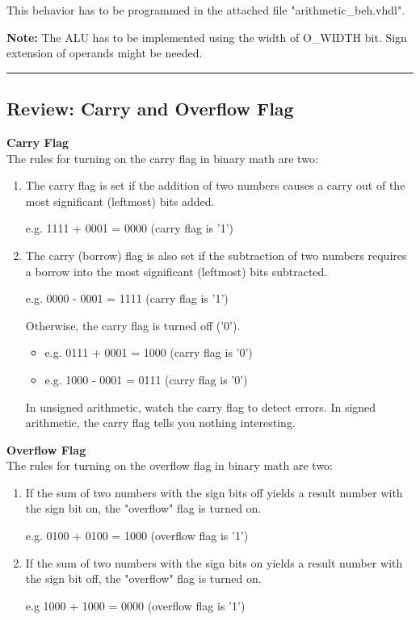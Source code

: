 \documentclass[a4paper,12pt]{article}
\begin{document}
This behavior has to be programmed in the attached file "arithmetic\_beh.vhdl".


\textbf{Note:} The ALU has to be implemented using the width of {{O_WIDTH}} bit. Sign extension
of operands might be needed.


\rule{16cm}{0.4pt}\par
\subsection*{Review: Carry and Overflow Flag}

\textbf{Carry Flag}\\
The rules for turning on the carry flag in binary math are two:
\begin{enumerate}
\item The carry flag is set if the addition of two numbers causes a carry
   out of the most significant (leftmost) bits added.

   e.g. 1111 + 0001 = 0000 (carry flag is '1')

\item The carry (borrow) flag is also set if the subtraction of two numbers
   requires a borrow into the most significant (leftmost) bits subtracted.

   e.g. 0000 - 0001 = 1111 (carry flag is '1')

Otherwise, the carry flag is turned off ('0').
\begin{itemize}
\item e.g. 0111 + 0001 = 1000 (carry flag is '0')
\item e.g. 1000 - 0001 = 0111 (carry flag is '0')
\end{itemize}


In unsigned arithmetic, watch the carry flag to detect errors.
In signed arithmetic, the carry flag tells you nothing interesting.

\end{enumerate}

\textbf{Overflow Flag}\\
The rules for turning on the overflow flag in binary math are two:
\begin{enumerate}
\item If the sum of two numbers with the sign bits off yields a result number
   with the sign bit on, the "overflow" flag is turned on.

   e.g. 0100 + 0100 = 1000 (overflow flag is '1')

\item If the sum of two numbers with the sign bits on yields a result number
   with the sign bit off, the "overflow" flag is turned on.

   e.g 1000 + 1000 = 0000 (overflow flag is '1')
\end{enumerate}
\end{document}
